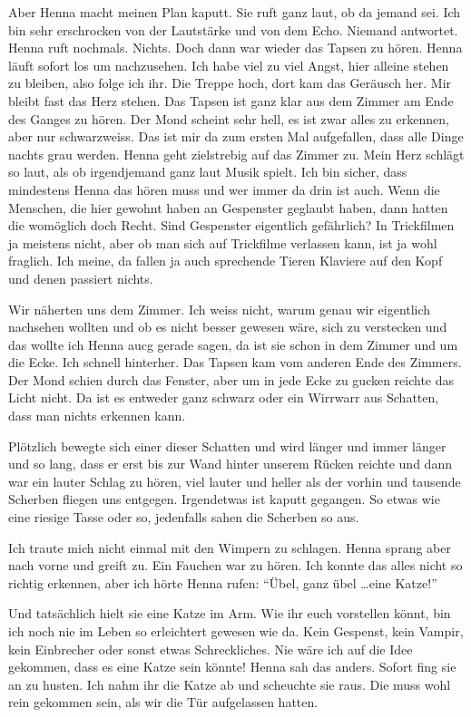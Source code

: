 Aber Henna macht meinen Plan kaputt. Sie ruft ganz laut, ob da jemand sei. Ich bin sehr erschrocken von der Lautstärke und von dem Echo. Niemand antwortet. Henna ruft nochmals. Nichts. Doch dann war wieder das Tapsen zu hören. Henna läuft sofort los um nachzusehen. Ich habe viel zu viel Angst, hier alleine stehen zu bleiben, also folge ich ihr. Die Treppe hoch, dort kam das Geräusch her. Mir bleibt fast das Herz stehen. Das Tapsen ist ganz klar aus dem Zimmer am Ende des Ganges zu hören. Der Mond scheint sehr hell, es ist zwar alles zu erkennen, aber nur schwarzweiss. Das ist mir da zum ersten Mal aufgefallen, dass alle Dinge nachts grau werden. Henna geht zielstrebig auf das Zimmer zu. Mein Herz schlägt so laut, als ob irgendjemand ganz laut Musik spielt. Ich bin sicher, dass mindestens Henna das hören muss und wer immer da drin ist auch. Wenn die Menschen, die hier gewohnt haben an Gespenster geglaubt haben, dann hatten die womöglich doch Recht. Sind Gespenster eigentlich gefährlich? In Trickfilmen ja meistens nicht, aber ob man sich auf Trickfilme verlassen kann, ist ja wohl fraglich. Ich meine, da fallen ja auch sprechende Tieren Klaviere auf den Kopf und denen passiert nichts. 

Wir näherten uns dem Zimmer. Ich weiss nicht, warum genau wir eigentlich nachsehen wollten und ob es nicht besser gewesen wäre, sich zu verstecken und das wollte ich Henna aucg gerade sagen, da ist sie schon in dem Zimmer und um die Ecke. Ich schnell hinterher. Das Tapsen kam vom anderen Ende des Zimmers. Der Mond schien durch das Fenster, aber um in jede Ecke zu gucken reichte das Licht nicht. Da ist es entweder ganz schwarz oder ein Wirrwarr aus Schatten, dass man nichts erkennen kann.

Plötzlich bewegte sich einer dieser Schatten und wird länger und immer länger und so lang, dass er erst bis zur Wand hinter unserem Rücken reichte und dann war ein lauter Schlag zu hören, viel lauter und heller als der vorhin und tausende Scherben fliegen uns entgegen. Irgendetwas ist kaputt gegangen. So etwas wie eine riesige Tasse oder so, jedenfalls sahen die Scherben so aus.

Ich traute mich nicht einmal mit den Wimpern zu schlagen. Henna sprang aber nach vorne und greift zu. Ein Fauchen war zu hören. Ich konnte das alles nicht so richtig erkennen, aber ich hörte Henna rufen: \enquote{Übel, ganz übel \dots eine Katze!}

Und tatsächlich hielt sie eine Katze im Arm. Wie ihr euch vorstellen könnt, bin ich noch nie im Leben so erleichtert gewesen wie da. Kein Gespenst, kein Vampir, kein Einbrecher oder sonst etwas Schreckliches. Nie wäre ich auf die Idee gekommen, dass es eine Katze sein könnte! Henna sah das anders. Sofort fing sie an zu husten. Ich nahm ihr die Katze ab und scheuchte sie raus. Die muss wohl rein gekommen sein, als wir die Tür aufgelassen hatten.

